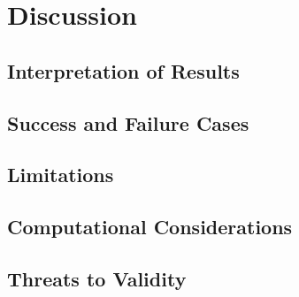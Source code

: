 \section{Discussion}

\subsection{Interpretation of Results}

\subsection{Success and Failure Cases}

\subsection{Limitations}

\subsection{Computational Considerations}

\subsection{Threats to Validity}

